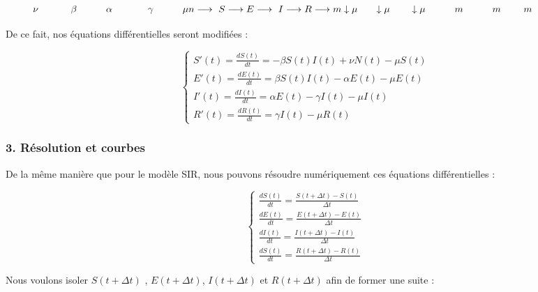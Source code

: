 \documentclass[
]{article}
\begin{document}
\[ \nu \ \ \ \ \ \  \  \ \ \ \beta\ \ \ \  \ \  \ \ \ \alpha \ \ \ \ \ \ \ \ \ \  \ \gamma  \ \ \ \ \ \ \  \ \   \mu \\ n \longrightarrow\ S  \longrightarrow E \longrightarrow\ I  \longrightarrow  R \longrightarrow m\\ \downarrow \mu   \ \ \ \  \ \downarrow \mu  \ \ \ \ \  \  \downarrow  \mu\ \ \ \ \ \ \ \  \ \ \\ m \ \ \ \ \ \ \ \  \ m  \ \ \ \ \ \  \  m \ \ \ \ \ \ \ \ \ \ \ \ \ \ \]

De ce fait, nos équations différentielles seront modifiées :

\[\begin{equation}
    \left\{
     \begin{array}{l}
        S'(t) = \frac{dS(t)}{dt} = - \beta S(t)  I(t) + \nu N(t) - \mu S(t)\\
        E'(t) = \frac{dE(t)}{dt} = \beta S(t)  I(t) - \alpha E(t) - \mu E(t)\\
        I'(t) = \frac{dI(t)}{dt} = \alpha E(t) - \gamma  I(t) - \mu I(t)\\
        R'(t) = \frac{dR(t)}{dt} = \gamma I(t) - \mu R(t)
      \end{array}
    \right.
\end{equation}\]

\hypertarget{ruxe9solution-et-courbes}{%
\subsubsection{3. Résolution et
courbes}\label{ruxe9solution-et-courbes}}

De la même manière que pour le modèle SIR, nous pouvons résoudre
numériquement ces équations différentielles :

\[\begin{equation}
    \left\{
     \begin{array}{l}
        \frac{dS(t)}{dt} = \frac{S(t + \Delta t)-S(t)}{\Delta t} \\
        \frac{dE(t)}{dt} = \frac{E(t + \Delta t)-E(t)}{\Delta t} \\
        \frac{dI(t)}{dt} = \frac{I(t + \Delta t) -I(t)}{\Delta t}  \\
        \frac{dS(t)}{dt} = \frac{R(t + \Delta t) -R(t)}{\Delta t} 
      \end{array}
    \right.
\end{equation}\]

Nous voulons isoler \(S(t + \Delta t)\) , \(E(t + \Delta t)\),
\(I(t + \Delta t)\) et \(R(t + \Delta t)\) afin de former une suite :
\end{document}
